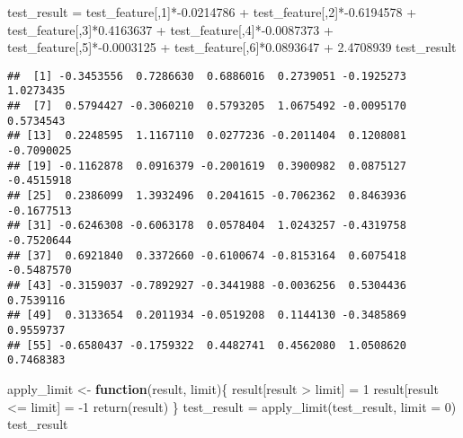 \documentclass[
]{article}
\newenvironment{Shaded}{\begin{snugshade}}{\end{snugshade}}
\newcommand{\AttributeTok}[1]{\textcolor[rgb]{0.77,0.63,0.00}{#1}}
\newcommand{\ControlFlowTok}[1]{\textcolor[rgb]{0.13,0.29,0.53}{\textbf{#1}}}
\newcommand{\DecValTok}[1]{\textcolor[rgb]{0.00,0.00,0.81}{#1}}
\newcommand{\FloatTok}[1]{\textcolor[rgb]{0.00,0.00,0.81}{#1}}
\newcommand{\FunctionTok}[1]{\textcolor[rgb]{0.00,0.00,0.00}{#1}}
\newcommand{\NormalTok}[1]{#1}
\newcommand{\OtherTok}[1]{\textcolor[rgb]{0.56,0.35,0.01}{#1}}
\newcommand{\SpecialCharTok}[1]{\textcolor[rgb]{0.00,0.00,0.00}{#1}}
\begin{document}
\begin{Shaded}
\begin{Highlighting}[]
\NormalTok{test\_result }\OtherTok{=}\NormalTok{ test\_feature[,}\DecValTok{1}\NormalTok{]}\SpecialCharTok{*{-}}\FloatTok{0.0214786} \SpecialCharTok{+}\NormalTok{ test\_feature[,}\DecValTok{2}\NormalTok{]}\SpecialCharTok{*{-}}\FloatTok{0.6194578} \SpecialCharTok{+}
\NormalTok{              test\_feature[,}\DecValTok{3}\NormalTok{]}\SpecialCharTok{*}\FloatTok{0.4163637} \SpecialCharTok{+}\NormalTok{ test\_feature[,}\DecValTok{4}\NormalTok{]}\SpecialCharTok{*{-}}\FloatTok{0.0087373} \SpecialCharTok{+}
\NormalTok{              test\_feature[,}\DecValTok{5}\NormalTok{]}\SpecialCharTok{*{-}}\FloatTok{0.0003125} \SpecialCharTok{+}\NormalTok{ test\_feature[,}\DecValTok{6}\NormalTok{]}\SpecialCharTok{*}\FloatTok{0.0893647} \SpecialCharTok{+} \FloatTok{2.4708939}
\NormalTok{test\_result}
\end{Highlighting}
\end{Shaded}

\begin{verbatim}
##  [1] -0.3453556  0.7286630  0.6886016  0.2739051 -0.1925273  1.0273435
##  [7]  0.5794427 -0.3060210  0.5793205  1.0675492 -0.0095170  0.5734543
## [13]  0.2248595  1.1167110  0.0277236 -0.2011404  0.1208081 -0.7090025
## [19] -0.1162878  0.0916379 -0.2001619  0.3900982  0.0875127 -0.4515918
## [25]  0.2386099  1.3932496  0.2041615 -0.7062362  0.8463936 -0.1677513
## [31] -0.6246308 -0.6063178  0.0578404  1.0243257 -0.4319758 -0.7520644
## [37]  0.6921840  0.3372660 -0.6100674 -0.8153164  0.6075418 -0.5487570
## [43] -0.3159037 -0.7892927 -0.3441988 -0.0036256  0.5304436  0.7539116
## [49]  0.3133654  0.2011934 -0.0519208  0.1144130 -0.3485869  0.9559737
## [55] -0.6580437 -0.1759322  0.4482741  0.4562080  1.0508620  0.7468383
\end{verbatim}

\begin{Shaded}
\begin{Highlighting}[]
\NormalTok{apply\_limit }\OtherTok{\textless{}{-}} \ControlFlowTok{function}\NormalTok{(result, limit)\{}
\NormalTok{  result[result }\SpecialCharTok{\textgreater{}}\NormalTok{ limit] }\OtherTok{=} \DecValTok{1}
\NormalTok{  result[result }\SpecialCharTok{\textless{}=}\NormalTok{ limit] }\OtherTok{=} \SpecialCharTok{{-}}\DecValTok{1}
  \FunctionTok{return}\NormalTok{(result)}
\NormalTok{\}}
\NormalTok{test\_result }\OtherTok{=} \FunctionTok{apply\_limit}\NormalTok{(test\_result, }\AttributeTok{limit =} \DecValTok{0}\NormalTok{)}
\NormalTok{test\_result}
\end{Highlighting}
\end{Shaded}
\end{document}
